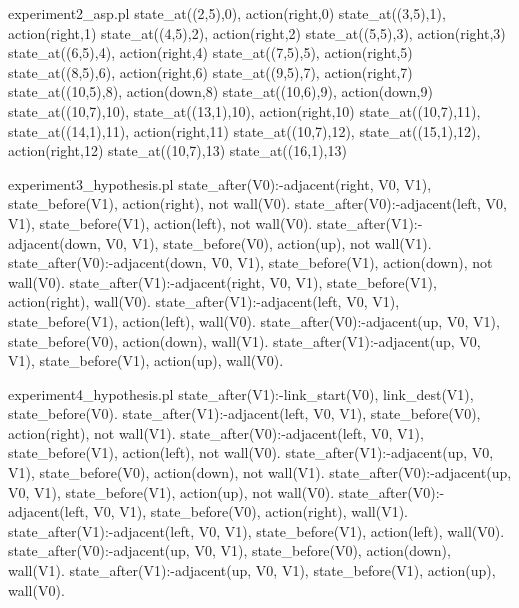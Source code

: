 \begin{filecontents*}{experiment2_asp.pl}
state_at((2,5),0), action(right,0)
state_at((3,5),1), action(right,1)
state_at((4,5),2), action(right,2)
state_at((5,5),3), action(right,3)
state_at((6,5),4), action(right,4)
state_at((7,5),5), action(right,5)
state_at((8,5),6), action(right,6)
state_at((9,5),7), action(right,7)
state_at((10,5),8), action(down,8)
state_at((10,6),9), action(down,9)
state_at((10,7),10), state_at((13,1),10), action(right,10)
state_at((10,7),11), state_at((14,1),11), action(right,11)
state_at((10,7),12), state_at((15,1),12), action(right,12)
state_at((10,7),13)
state_at((16,1),13)
\end{filecontents*}

\begin{filecontents*}{experiment3_hypothesis.pl}
state_after(V0):-adjacent(right, V0, V1), state_before(V1), 
                 action(right), not wall(V0).
state_after(V0):-adjacent(left, V0, V1), state_before(V1), 
                 action(left), not wall(V0).
state_after(V1):-adjacent(down, V0, V1), state_before(V0), 
                 action(up), not wall(V1).
state_after(V0):-adjacent(down, V0, V1), state_before(V1), 
                 action(down), not wall(V0).
state_after(V1):-adjacent(right, V0, V1), state_before(V1), 
                 action(right), wall(V0).
state_after(V1):-adjacent(left, V0, V1), state_before(V1), 
                 action(left), wall(V0).
state_after(V0):-adjacent(up, V0, V1), state_before(V0), 
                 action(down), wall(V1).
state_after(V1):-adjacent(up, V0, V1), state_before(V1), 
                 action(up), wall(V0).
\end{filecontents*}
  
\begin{filecontents*}{experiment4_hypothesis.pl}
state_after(V1):-link_start(V0), link_dest(V1), 
                 state_before(V0).
state_after(V1):-adjacent(left, V0, V1), state_before(V0), 
                 action(right), not wall(V1).
state_after(V0):-adjacent(left, V0, V1), state_before(V1), 
                 action(left), not wall(V0).
state_after(V1):-adjacent(up, V0, V1), state_before(V0), 
                 action(down), not wall(V1).
state_after(V0):-adjacent(up, V0, V1), state_before(V1), 
                 action(up), not wall(V0).
state_after(V0):-adjacent(left, V0, V1), state_before(V0), 
                 action(right), wall(V1).
state_after(V1):-adjacent(left, V0, V1), state_before(V1), 
                 action(left), wall(V0).
state_after(V0):-adjacent(up, V0, V1), state_before(V0), 
                 action(down), wall(V1).
state_after(V1):-adjacent(up, V0, V1), state_before(V1), 
                 action(up), wall(V0).  
\end{filecontents*}